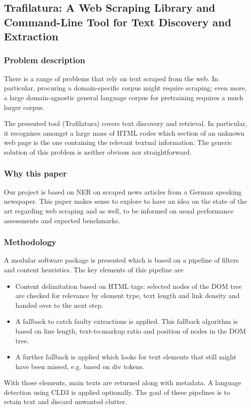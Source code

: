 \documentclass[11pt]{article}
\begin{document}
\subsection{Trafilatura: A Web Scraping Library and Command-Line Tool for Text Discovery and Extraction \citet{barbaresi-2021-trafilatura}}

\subsubsection{Problem description}

There is a range of problems that rely on text scraped from the web. In particular, procuring a domain-specific corpus might require scraping; even more, a large domain-agnostic general language corpus for pretraining requires a much larger corpus. 

The presented tool (Trafilatura) covers text discovery and retrieval. In particular, it recognizes amongst a large mass of HTML codes which section of an unknown web page is the one containing the relevant textual information. The generic solution of this problem is neither obvious nor straightforward. 

\subsubsection{Why this paper}

Our project is based on NER on scraped news articles from a German speaking newspaper. This paper makes sense to explore to have an idea on the state of the art regarding web scraping and as well, to be informed on usual performance assessments and expected benchmarks. 

\subsubsection{Methodology}

A modular software package is presented which is based on a pipeline of filters and content heuristics. The key elements of this pipeline are 
\begin{itemize}
    \item Content delimitation based on HTML tags: selected nodes of the DOM tree are checked for relevance by element type, text length and link density and handed over to the next step. 
    \item A fallback to catch faulty extractions is applied. This fallback algorithm is based on line length, text-to-markup ratio and position of nodes in the DOM tree. 
    \item A further fallback is applied which looks for text elements that still might have been missed, e.g. based on div tokens. 
\end{itemize}
With those elements, main texts are returned along with metadata. A language detection using CLD3 is applied optionally. The goal of these pipelines is to retain text and discard unwanted clutter. 
\end{document}

